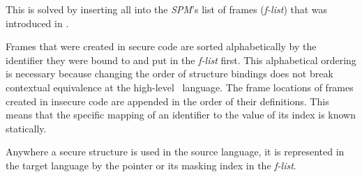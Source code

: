 This is solved by inserting all  into the \emph{SPM}'s list of frames (\emph{f-list}) that was introduced in . 

Frames that were created in secure code are sorted alphabetically by the identifier they were bound to and put in the \emph{f-list} first.
This alphabetical ordering is necessary because changing the order of structure bindings does not break contextual equivalence at the high-level \MiniML\ language.
The frame locations of frames created in insecure code are appended in the order of their definitions.
This means that the specific mapping of an identifier to the value of its index is known statically.

Anywhere a secure structure is used in the source language, it is represented in the target language by the  pointer or its masking index in the \emph{f-list}.

